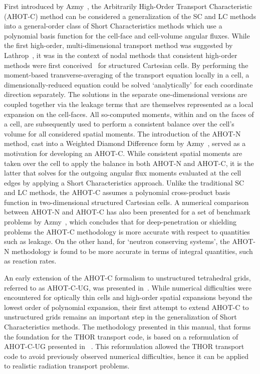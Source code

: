 First introduced by Azmy~\cite{Azmy1992}, the Arbitrarily High-Order Transport Characteristic (\ac{AHOT-C}) method can be considered a generalization of the \ac{SC} and \ac{LC} methods into a general-order class of Short Characteristics methods which use a polynomial basis function for the cell-face and cell-volume angular fluxes.
While the first high-order, multi-dimensional transport method was suggested by Lathrop~\cite{Lathrop1969}, it was in the context of nodal methods that consistent high-order methods were first conceived~\cite{Azmy1992} for structured Cartesian cells.
By performing the moment-based transverse-averaging of the transport equation locally in a cell, a dimensionally-reduced equation could be solved ‘analytically’ for each coordinate direction separately.
The solutions in the separate one-dimensional versions are coupled together via the leakage terms that are themselves represented as a local expansion on the cell-faces.
All so-computed moments, within and on the faces of a cell, are subsequently used to perform a consistent balance over the cell's volume for all considered spatial moments.
The introduction of the \ac{AHOT-N} method, cast into a Weighted Diamond Difference form by Azmy~\cite{Azmy1988a}, served as a motivation for developing an \ac{AHOT-C}.
While consistent spatial moments are taken over the cell to apply the balance in both \ac{AHOT-N} and \ac{AHOT-C}, it is the latter that solves for the outgoing angular flux moments evaluated at the cell edges by applying a Short Characteristics approach.
Unlike the traditional \ac{SC} and \ac{LC} methods, the \ac{AHOT-C} assumes a polynomial cross-product basis function in two-dimensional structured Cartesian cells.
A numerical comparison between \ac{AHOT-N} and \ac{AHOT-C} has also been presented for a set of benchmark problems by Azmy~\cite{Azmy1992}, which concludes that for deep-penetration or shielding problems the \ac{AHOT-C} methodology is more accurate with respect to quantities such as leakage.
On the other hand, for ‘neutron conserving systems’, the \ac{AHOT-N} methodology is found to be more accurate in terms of integral quantities, such as reaction rates.

An early extension of the \ac{AHOT-C} formalism to unstructured tetrahedral grids,  referred  to as \acs{AHOT-C-UG}, was presented in~\cite{Azmy2001}.
While numerical difficulties were encountered for optically thin cells and high-order spatial expansions beyond the lowest order of polynomial expansion, their first attempt to extend \ac{AHOT-C} to unstructured grids remains an important step in the generalization of Short Characteristics methods.
The methodology presented in this manual, that forms the foundation for the \ac{THOR} transport code, is based on a reformulation of \acs{AHOT-C-UG} presented in ~\cite{FerrerPhD}.
This reformulation allowed the \ac{THOR} transport code to avoid previously observed numerical difficulties, hence it can be applied to realistic radiation transport problems.